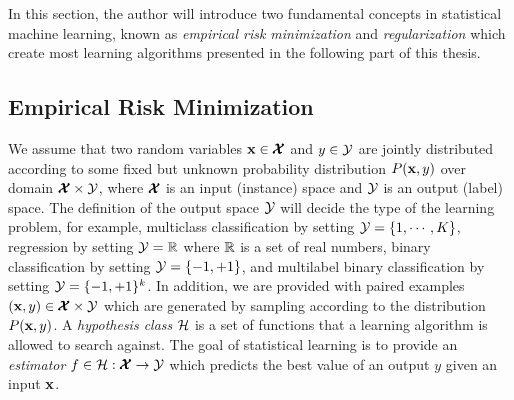 In this section, the author will introduce two fundamental concepts in statistical machine learning, known as \textit{empirical risk minimization} \citep{Vapnik92principles} and \textit{regularization} \citep{Evgeniou99a} which create most learning algorithms presented in the following part of this thesis.

\subsection{Empirical Risk Minimization}\label{sc_erm}

We assume that two random variables $\mathbf {x}\in\pmb {\mathcal{X}}$ and $y\in\mathcal{Y}$ are jointly distributed according to some fixed but unknown probability distribution $P(\mathbf {x},y)$ over domain $\pmb {\mathcal{X}}\times\mathcal{Y}$, where $\pmb {\mathcal{X}}$ is an input (instance) space and $\mathcal{Y}$ is an output (label) space.
The definition of the output space $\mathcal{Y}$ will decide the type of the learning problem,
for example, 
multiclass classification by setting $\mathcal{Y}=\{1,\cdots,K\}$,
regression by setting $\mathcal{Y}=\mathbb{R}$ where $\mathbb{R}$ is a set of real numbers,
binary classification by setting $\mathcal{Y}=\{-1,+1\}$, 
and multilabel binary classification by setting $\mathcal{Y} = \{-1,+1\}^k$.
In addition, we are provided with paired examples $(\mathbf {x},y)\in\pmb {\mathcal{X}}\times\mathcal{Y}$ which are generated by sampling according to the distribution $P(\mathbf {x},y)$.
A \textit{hypothesis class} $\mathcal{H}$ is a set of functions that a learning algorithm is allowed to search against.
The goal of statistical learning is to provide an \textit{estimator} $f\in\mathcal{H}:\pmb {\mathcal{X}}\rightarrow\mathcal{Y}$ which predicts the best value of an output $y$ given an input $\mathbf {x}$.

